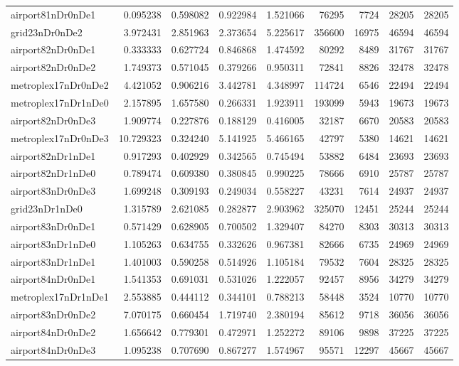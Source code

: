\begin{longtable}{|l|r|r|r|r|r|r|r|r|}
airport81nDr0nDe1 & 0.095238 & 0.598082 & 0.922984 & 1.521066 & 76295 & 7724 & 28205 & 28205 \\
grid23nDr0nDe2 & 3.972431 & 2.851963 & 2.373654 & 5.225617 & 356600 & 16975 & 46594 & 46594 \\
airport82nDr0nDe1 & 0.333333 & 0.627724 & 0.846868 & 1.474592 & 80292 & 8489 & 31767 & 31767 \\
airport82nDr0nDe2 & 1.749373 & 0.571045 & 0.379266 & 0.950311 & 72841 & 8826 & 32478 & 32478 \\
metroplex17nDr0nDe2 & 4.421052 & 0.906216 & 3.442781 & 4.348997 & 114724 & 6546 & 22494 & 22494 \\
metroplex17nDr1nDe0 & 2.157895 & 1.657580 & 0.266331 & 1.923911 & 193099 & 5943 & 19673 & 19673 \\
airport82nDr0nDe3 & 1.909774 & 0.227876 & 0.188129 & 0.416005 & 32187 & 6670 & 20583 & 20583 \\
metroplex17nDr0nDe3 & 10.729323 & 0.324240 & 5.141925 & 5.466165 & 42797 & 5380 & 14621 & 14621 \\
airport82nDr1nDe1 & 0.917293 & 0.402929 & 0.342565 & 0.745494 & 53882 & 6484 & 23693 & 23693 \\
airport82nDr1nDe0 & 0.789474 & 0.609380 & 0.380845 & 0.990225 & 78666 & 6910 & 25787 & 25787 \\
airport83nDr0nDe3 & 1.699248 & 0.309193 & 0.249034 & 0.558227 & 43231 & 7614 & 24937 & 24937 \\
grid23nDr1nDe0 & 1.315789 & 2.621085 & 0.282877 & 2.903962 & 325070 & 12451 & 25244 & 25244 \\
airport83nDr0nDe1 & 0.571429 & 0.628905 & 0.700502 & 1.329407 & 84270 & 8303 & 30313 & 30313 \\
airport83nDr1nDe0 & 1.105263 & 0.634755 & 0.332626 & 0.967381 & 82666 & 6735 & 24969 & 24969 \\
airport83nDr1nDe1 & 1.401003 & 0.590258 & 0.514926 & 1.105184 & 79532 & 7604 & 28325 & 28325 \\
airport84nDr0nDe1 & 1.541353 & 0.691031 & 0.531026 & 1.222057 & 92457 & 8956 & 34279 & 34279 \\
metroplex17nDr1nDe1 & 2.553885 & 0.444112 & 0.344101 & 0.788213 & 58448 & 3524 & 10770 & 10770 \\
airport83nDr0nDe2 & 7.070175 & 0.660454 & 1.719740 & 2.380194 & 85612 & 9718 & 36056 & 36056 \\
airport84nDr0nDe2 & 1.656642 & 0.779301 & 0.472971 & 1.252272 & 89106 & 9898 & 37225 & 37225 \\
airport84nDr0nDe3 & 1.095238 & 0.707690 & 0.867277 & 1.574967 & 95571 & 12297 & 45667 & 45667 \\

\end{longtable}
